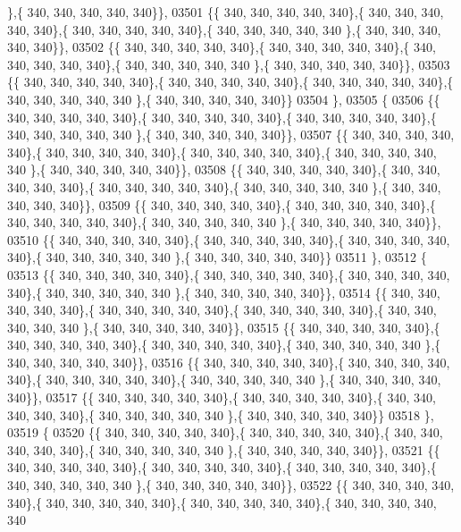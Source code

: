 \begin{DoxyCode}
      \},\{ 340, 340, 340, 340, 340\}\},
03501 \{\{ 340, 340, 340, 340, 340\},\{ 340, 340, 340, 340, 340\},\{ 340, 340, 340, 340, 340\},\{ 340, 340, 340, 340, 340
      \},\{ 340, 340, 340, 340, 340\}\},
03502 \{\{ 340, 340, 340, 340, 340\},\{ 340, 340, 340, 340, 340\},\{ 340, 340, 340, 340, 340\},\{ 340, 340, 340, 340, 340
      \},\{ 340, 340, 340, 340, 340\}\},
03503 \{\{ 340, 340, 340, 340, 340\},\{ 340, 340, 340, 340, 340\},\{ 340, 340, 340, 340, 340\},\{ 340, 340, 340, 340, 340
      \},\{ 340, 340, 340, 340, 340\}\}
03504 \},
03505 \{
03506 \{\{ 340, 340, 340, 340, 340\},\{ 340, 340, 340, 340, 340\},\{ 340, 340, 340, 340, 340\},\{ 340, 340, 340, 340, 340
      \},\{ 340, 340, 340, 340, 340\}\},
03507 \{\{ 340, 340, 340, 340, 340\},\{ 340, 340, 340, 340, 340\},\{ 340, 340, 340, 340, 340\},\{ 340, 340, 340, 340, 340
      \},\{ 340, 340, 340, 340, 340\}\},
03508 \{\{ 340, 340, 340, 340, 340\},\{ 340, 340, 340, 340, 340\},\{ 340, 340, 340, 340, 340\},\{ 340, 340, 340, 340, 340
      \},\{ 340, 340, 340, 340, 340\}\},
03509 \{\{ 340, 340, 340, 340, 340\},\{ 340, 340, 340, 340, 340\},\{ 340, 340, 340, 340, 340\},\{ 340, 340, 340, 340, 340
      \},\{ 340, 340, 340, 340, 340\}\},
03510 \{\{ 340, 340, 340, 340, 340\},\{ 340, 340, 340, 340, 340\},\{ 340, 340, 340, 340, 340\},\{ 340, 340, 340, 340, 340
      \},\{ 340, 340, 340, 340, 340\}\}
03511 \},
03512 \{
03513 \{\{ 340, 340, 340, 340, 340\},\{ 340, 340, 340, 340, 340\},\{ 340, 340, 340, 340, 340\},\{ 340, 340, 340, 340, 340
      \},\{ 340, 340, 340, 340, 340\}\},
03514 \{\{ 340, 340, 340, 340, 340\},\{ 340, 340, 340, 340, 340\},\{ 340, 340, 340, 340, 340\},\{ 340, 340, 340, 340, 340
      \},\{ 340, 340, 340, 340, 340\}\},
03515 \{\{ 340, 340, 340, 340, 340\},\{ 340, 340, 340, 340, 340\},\{ 340, 340, 340, 340, 340\},\{ 340, 340, 340, 340, 340
      \},\{ 340, 340, 340, 340, 340\}\},
03516 \{\{ 340, 340, 340, 340, 340\},\{ 340, 340, 340, 340, 340\},\{ 340, 340, 340, 340, 340\},\{ 340, 340, 340, 340, 340
      \},\{ 340, 340, 340, 340, 340\}\},
03517 \{\{ 340, 340, 340, 340, 340\},\{ 340, 340, 340, 340, 340\},\{ 340, 340, 340, 340, 340\},\{ 340, 340, 340, 340, 340
      \},\{ 340, 340, 340, 340, 340\}\}
03518 \},
03519 \{
03520 \{\{ 340, 340, 340, 340, 340\},\{ 340, 340, 340, 340, 340\},\{ 340, 340, 340, 340, 340\},\{ 340, 340, 340, 340, 340
      \},\{ 340, 340, 340, 340, 340\}\},
03521 \{\{ 340, 340, 340, 340, 340\},\{ 340, 340, 340, 340, 340\},\{ 340, 340, 340, 340, 340\},\{ 340, 340, 340, 340, 340
      \},\{ 340, 340, 340, 340, 340\}\},
03522 \{\{ 340, 340, 340, 340, 340\},\{ 340, 340, 340, 340, 340\},\{ 340, 340, 340, 340, 340\},\{ 340, 340, 340, 340, 340

\end{DoxyCode}
